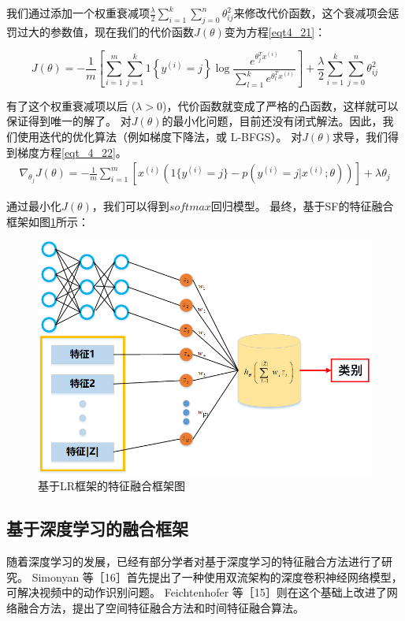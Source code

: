 我们通过添加一个权重衰减项$\frac{\lambda}{2} \sum_{i=1}^k \sum_{j=0}^{n} \theta_{ij}^2$来修改代价函数，这个衰减项会惩罚过大的参数值，现在我们的代价函数$J(\theta)$变为方程\eqref{eqt4_21}：\par
\begin{equation}
	\label{eqt4_21}
	J(\theta) = - \frac{1}{m} \left[ \sum_{i=1}^{m} \sum_{j=1}^{k} 1\left\{y^{(i)} 
	= j\right\} \log \frac{e^{\theta_j^T x^{(i)}}}{\sum_{l=1}^k e^{ \theta_l^T x^{(i)} }}  \right]
	+ \frac{\lambda}{2} \sum_{i=1}^k \sum_{j=0}^n \theta_{ij}^2
\end{equation}

有了这个权重衰减项以后 ($\lambda > 0$)，代价函数就变成了严格的凸函数，这样就可以保证得到唯一的解了。
对$J(\theta)$的最小化问题，目前还没有闭式解法。因此，我们使用迭代的优化算法（例如梯度下降法，或 L-BFGS）。
对$J(\theta)$求导，我们得到梯度方程\eqref{eqt_4_22}。
\begin{align}
	\label{eqt_4_22}
	\nabla_{\theta_j} J(\theta) = - \frac{1}{m} \sum_{i=1}^{m}{ \left[ x^{(i)} ( 1\{ y^{(i)} = j\}  - p(y^{(i)} = j | x^{(i)}; \theta) ) \right]  } + \lambda \theta_j
\end{align}

通过最小化$J(\theta)$，我们可以得到$softmax$回归模型。
最终，基于SF的特征融合框架如图\ref{sec:fig_4_2}所示：\par
\begin{figure}[!h]
	\centering
	\includegraphics[scale=0.7]{figures/chapter_4/fig_4_2}
	\caption{基于LR框架的特征融合框架图}\label{sec:fig_4_2}
\end{figure}


\subsection{基于深度学习的融合框架}
随着深度学习的发展，已经有部分学者对基于深度学习的特征融合方法进行了研究。
Simonyan 等［16］首先提出了一种使用双流架构的深度卷积神经网络模型，可解决视频中的动作识别问题。
Feichtenhofer 等［15］则在这个基础上改进了网络融合方法，提出了空间特征融合方法和时间特征融合算法。\par

